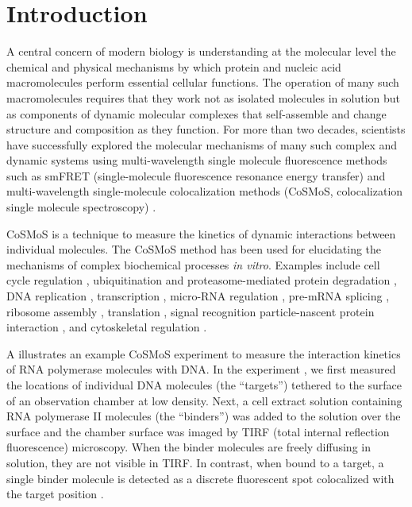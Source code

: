 \section{Introduction}

A central concern of modern biology is understanding at the molecular level the chemical and physical mechanisms by which protein and nucleic acid macromolecules  perform essential cellular functions.  The operation of many such macromolecules requires that they work not as isolated molecules in solution but as components of dynamic molecular complexes that self-assemble and change structure and composition as they function.  For more than  two decades, scientists have successfully explored the molecular mechanisms of many such complex and dynamic systems using multi-wavelength single molecule fluorescence methods such as smFRET (single-molecule fluorescence resonance energy transfer) \citep{Roy2008-fo} and multi-wavelength single-molecule colocalization methods (CoSMoS, colocalization single molecule spectroscopy) \citep{Larson2014-os, Van_Oijen2011-ig}.

CoSMoS is a technique to measure the kinetics of dynamic interactions between individual molecules.  The CoSMoS method has been used for elucidating the mechanisms of complex biochemical processes \textit{in vitro}. Examples include cell cycle regulation \citep{Lu2015-eu}, ubiquitination and proteasome-mediated protein degradation \citep{Lu2015-jq}, DNA replication \citep{Geertsema2014-bt,Ticau2015-ib}, transcription \citep{Zhang2012-no,Friedman2012-if,Friedman2013-sf}, micro-RNA regulation \citep{Salomon2015-kq}, pre-mRNA splicing \citep{Shcherbakova2013-bi, Krishnan2013-fy, Warnasooriya2014-ls}, ribosome assembly \citep{Kim2014-zc}, translation \citep{Wang2015-tt,Tsai2014-mi,OLeary2013-wo}, signal recognition particle-nascent protein interaction \citep{Noriega2014-vj}, and cytoskeletal regulation \citep{Smith2013-qj,Breitsprecher2012-mj}. 

A illustrates an example CoSMoS experiment to measure the interaction kinetics of RNA polymerase molecules with DNA. In the experiment \citep{Rosen2020-zn}, we first measured the locations of individual DNA molecules (the ``targets'') tethered to the surface of an observation chamber at low density. Next, a cell extract solution containing RNA polymerase II molecules (the ``binders'') was added to the solution over the surface and the chamber surface was imaged by TIRF (total internal reflection fluorescence) microscopy. When the binder molecules are freely diffusing in solution, they are not visible in TIRF. In contrast, when bound to a target, a single binder molecule is detected as a discrete fluorescent spot colocalized with the target position \citep{Friedman2006-kb, Friedman2015-nx}.

